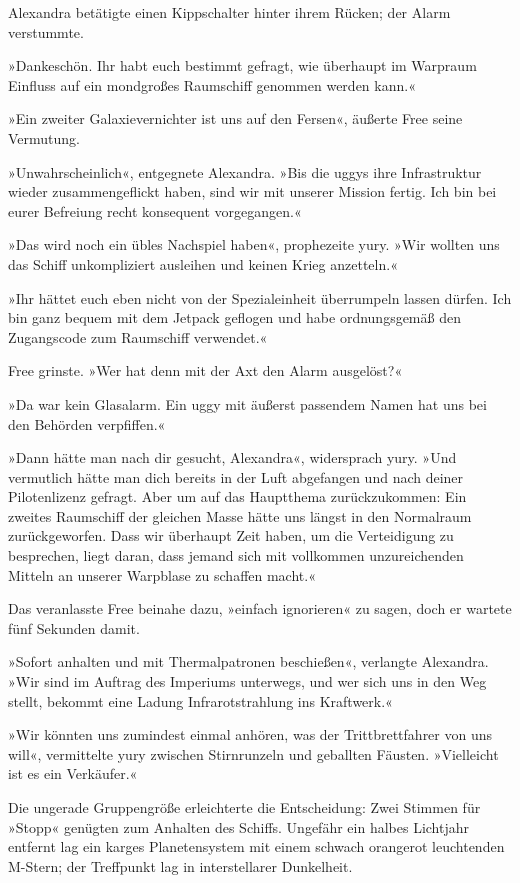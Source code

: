  Alexandra betätigte einen Kippschalter hinter ihrem Rücken; der Alarm verstummte.

»Dankeschön. Ihr habt euch bestimmt gefragt, wie überhaupt im Warpraum Einfluss auf ein mondgroßes Raumschiff genommen werden kann.«

»Ein zweiter Galaxievernichter ist uns auf den Fersen«, äußerte Free seine Vermutung.

»Unwahrscheinlich«, entgegnete Alexandra. »Bis die uggys ihre Infrastruktur wieder zusammengeflickt haben, sind wir mit unserer Mission fertig. Ich bin bei eurer Befreiung recht konsequent vorgegangen.«

»Das wird noch ein übles Nachspiel haben«, prophezeite yury. »Wir wollten uns das Schiff unkompliziert ausleihen und keinen Krieg anzetteln.«

»Ihr hättet euch eben nicht von der Spezialeinheit überrumpeln lassen dürfen. Ich bin ganz bequem mit dem Jetpack geflogen und habe ordnungsgemäß den Zugangscode zum Raumschiff verwendet.«

Free grinste. »Wer hat denn mit der Axt den Alarm ausgelöst?«

»Da war kein Glasalarm. Ein uggy mit äußerst passendem Namen hat uns bei den Behörden verpfiffen.«

»Dann hätte man nach dir gesucht, Alexandra«, widersprach yury. »Und vermutlich hätte man dich bereits in der Luft abgefangen und nach deiner Pilotenlizenz gefragt. Aber um auf das Hauptthema zurückzukommen: Ein zweites Raumschiff der gleichen Masse hätte uns längst in den Normalraum zurückgeworfen. Dass wir überhaupt Zeit haben, um die Verteidigung zu besprechen, liegt daran, dass jemand sich mit vollkommen unzureichenden Mitteln an unserer Warpblase zu schaffen macht.«

Das veranlasste Free beinahe dazu, »einfach ignorieren« zu sagen, doch er wartete fünf Sekunden damit.

»Sofort anhalten und mit Thermalpatronen beschießen«, verlangte Alexandra. »Wir sind im Auftrag des Imperiums unterwegs, und wer sich uns in den Weg stellt, bekommt eine Ladung Infrarotstrahlung ins Kraftwerk.«

»Wir könnten uns zumindest einmal anhören, was der Trittbrettfahrer von uns will«, vermittelte yury zwischen Stirnrunzeln und geballten Fäusten. »Vielleicht ist es ein Verkäufer.«

Die ungerade Gruppengröße erleichterte die Entscheidung: Zwei Stimmen für »Stopp« genügten zum Anhalten des Schiffs. Ungefähr ein halbes Lichtjahr entfernt lag ein karges Planetensystem mit einem schwach orangerot leuchtenden M-Stern; der Treffpunkt lag in interstellarer Dunkelheit.

